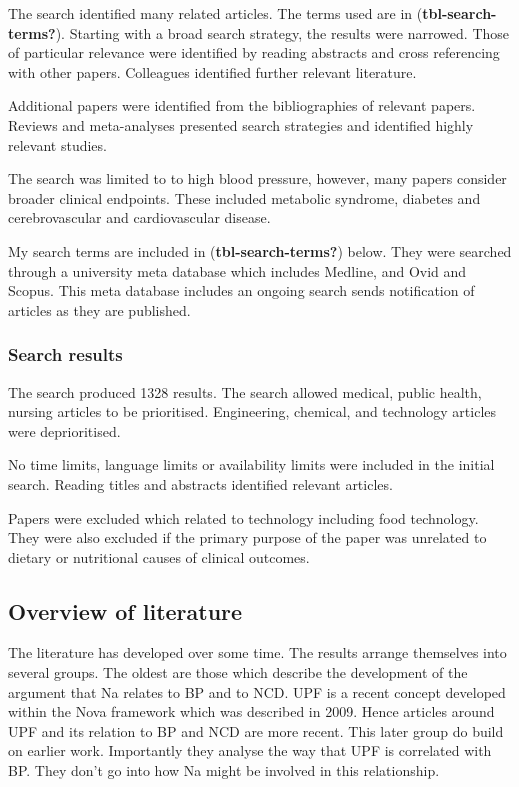 \documentclass[
]{article}
\begin{document}
The search identified many related articles. The terms used are in
(\textbf{tbl-search-terms?}). Starting with a broad search strategy, the
results were narrowed. Those of particular relevance were identified by
reading abstracts and cross referencing with other papers. Colleagues
identified further relevant literature.

Additional papers were identified from the bibliographies of relevant
papers. Reviews and meta-analyses presented search strategies and
identified highly relevant studies.

The search was limited to to high blood pressure, however, many papers
consider broader clinical endpoints. These included metabolic syndrome,
diabetes and cerebrovascular and cardiovascular disease.

My search terms are included in (\textbf{tbl-search-terms?}) below. They
were searched through a university meta database which includes Medline,
and Ovid and Scopus. This meta database includes an ongoing search sends
notification of articles as they are published.

\hypertarget{search-results}{%
\subsubsection{Search results}\label{search-results}}

The search produced 1328 results. The search allowed medical, public
health, nursing articles to be prioritised. Engineering, chemical, and
technology articles were deprioritised.

No time limits, language limits or availability limits were included in
the initial search. Reading titles and abstracts identified relevant
articles.

Papers were excluded which related to technology including food
technology. They were also excluded if the primary purpose of the paper
was unrelated to dietary or nutritional causes of clinical outcomes.

\hypertarget{overview-of-literature}{%
\subsection{Overview of literature}\label{overview-of-literature}}

The literature has developed over some time. The results arrange
themselves into several groups. The oldest are those which describe the
development of the argument that Na relates to BP and to NCD. UPF is a
recent concept developed within the Nova framework which was described
in 2009. Hence articles around UPF and its relation to BP and NCD are
more recent. This later group do build on earlier work. Importantly they
analyse the way that UPF is correlated with BP. They don't go into how
Na might be involved in this relationship.
\end{document}
